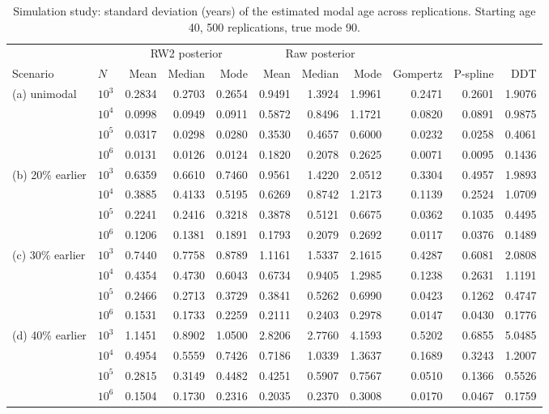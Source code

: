 \begin{table}[htb!]
\centering
\caption{Simulation study: standard deviation (years) of the estimated modal age across replications. Starting age 40, 500 replications, true mode 90.}
\label{tab:app_sd}
\scriptsize
\setlength{\tabcolsep}{4pt}
\begin{tabular}{llrrrrrrrrr}
\hline
 & & \multicolumn{3}{c}{RW2 posterior} & \multicolumn{3}{c}{Raw posterior} & & & \\
Scenario & $N$ & Mean & Median & Mode & Mean & Median & Mode & Gompertz & P-spline & DDT \\
\hline
(a) unimodal & $10^3$ & 0.2834 & 0.2703 & 0.2654 & 0.9491 & 1.3924 & 1.9961 & 0.2471 & 0.2601 & 1.9076 \\
 & $10^4$ & 0.0998 & 0.0949 & 0.0911 & 0.5872 & 0.8496 & 1.1721 & 0.0820 & 0.0891 & 0.9875 \\
 & $10^5$ & 0.0317 & 0.0298 & 0.0280 & 0.3530 & 0.4657 & 0.6000 & 0.0232 & 0.0258 & 0.4061 \\
 & $10^6$ & 0.0131 & 0.0126 & 0.0124 & 0.1820 & 0.2078 & 0.2625 & 0.0071 & 0.0095 & 0.1436 \\[2pt]
(b) 20\% earlier & $10^3$ & 0.6359 & 0.6610 & 0.7460 & 0.9561 & 1.4220 & 2.0512 & 0.3304 & 0.4957 & 1.9893 \\
 & $10^4$ & 0.3885 & 0.4133 & 0.5195 & 0.6269 & 0.8742 & 1.2173 & 0.1139 & 0.2524 & 1.0709 \\
 & $10^5$ & 0.2241 & 0.2416 & 0.3218 & 0.3878 & 0.5121 & 0.6675 & 0.0362 & 0.1035 & 0.4495 \\
 & $10^6$ & 0.1206 & 0.1381 & 0.1891 & 0.1793 & 0.2079 & 0.2692 & 0.0117 & 0.0376 & 0.1489 \\[2pt]
(c) 30\% earlier & $10^3$ & 0.7440 & 0.7758 & 0.8789 & 1.1161 & 1.5337 & 2.1615 & 0.4287 & 0.6081 & 2.0808 \\
 & $10^4$ & 0.4354 & 0.4730 & 0.6043 & 0.6734 & 0.9405 & 1.2985 & 0.1238 & 0.2631 & 1.1191 \\
 & $10^5$ & 0.2466 & 0.2713 & 0.3729 & 0.3841 & 0.5262 & 0.6990 & 0.0423 & 0.1262 & 0.4747 \\
 & $10^6$ & 0.1531 & 0.1733 & 0.2259 & 0.2111 & 0.2403 & 0.2978 & 0.0147 & 0.0430 & 0.1776 \\[2pt]
(d) 40\% earlier & $10^3$ & 1.1451 & 0.8902 & 1.0500 & 2.8206 & 2.7760 & 4.1593 & 0.5202 & 0.6855 & 5.0485 \\
 & $10^4$ & 0.4954 & 0.5559 & 0.7426 & 0.7186 & 1.0339 & 1.3637 & 0.1689 & 0.3243 & 1.2007 \\
 & $10^5$ & 0.2815 & 0.3149 & 0.4482 & 0.4251 & 0.5907 & 0.7567 & 0.0510 & 0.1366 & 0.5526 \\
 & $10^6$ & 0.1504 & 0.1730 & 0.2316 & 0.2035 & 0.2370 & 0.3008 & 0.0170 & 0.0467 & 0.1759 \\
\hline
\end{tabular}
\end{table}
